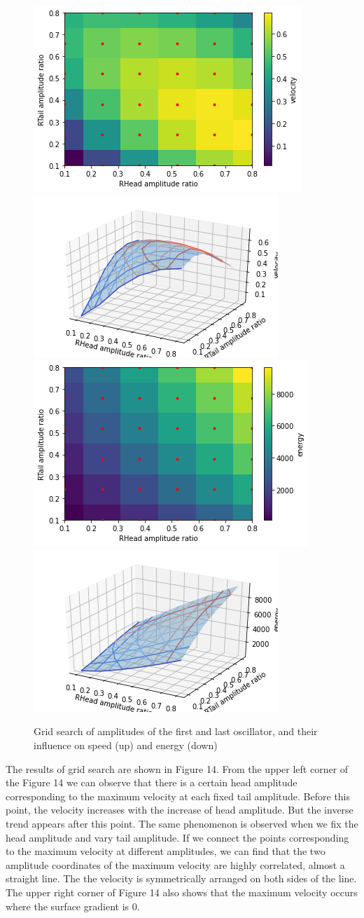 \documentclass{cmc}
\begin{document}
\begin{figure}[H]
\centering
\includegraphics[height=0.3\columnwidth]{figures/8c_v1.png}
\includegraphics[height=0.3\columnwidth]{figures/8c_v2.png}
\includegraphics[height=0.3\columnwidth]{figures/8c_e1.png}
\includegraphics[height=0.3\columnwidth]{figures/8c_e2.png}
\caption{Grid search of amplitudes of the first and last oscillator, and their influence on speed (up) and energy (down)}
\label{c}
\end{figure}

The results of grid search are shown in Figure 14.
From the upper left corner of the Figure 14 we can observe that there is a certain head amplitude corresponding to the maximum velocity at each fixed tail amplitude. Before this point, the velocity increases with the increase of head amplitude. But the inverse trend appears after this point. The same phenomenon is observed when we fix the head amplitude and vary tail amplitude. If we connect the points corresponding to the maximum velocity at different amplitudes, we can find that the two amplitude coordinates of the maximum velocity are highly correlated, almost a straight line. The the velocity is symmetrically arranged on both sides of the line. The upper right corner of Figure 14 also shows that the maximum velocity occurs where the surface gradient is 0.
\end{document}
